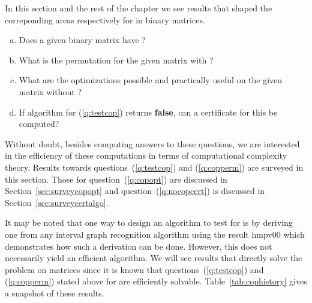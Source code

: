 In this section and the rest of the chapter we see results that shaped the
correponding areas respectively for \cop in binary matrices.

\begin{enumerate}[a.]
\singlespacing
\item \label{q:testcop} Does a given binary matrix have \COP?
\item \label{q:copperm} What is the \COP permutation for the given matrix with \COP?
\item \label{q:copopt} What are the optimizations possible and practically useful on
  the given matrix without \COP?
\item \label{q:nocopcert} If algorithm for (\ref{q:testcop}) returns
  \textbf{false}, can a certificate for this be computed?
\end{enumerate}

Without doubt, besides computing answers to these questions, we are
interested in the efficiency of these computations in terms of
computational complexity theory. Results towards
questions~(\ref{q:testcop}) and (\ref{q:copperm}) are surveyed in this
section. Those for question~(\ref{q:copopt}) are discussed in
Section~\ref{sec:surveycopopt} and question~(\ref{q:nocopcert}) is discussed
in Section~\ref{sec:surveycertalgo}.

It may be noted that one way to design an algorithm to test for \COP
is by deriving one from any interval graph recognition algorithm using the
result {\sc hmpv00}  \cite{d08phd} which demonstrates how such a derivation can be
done. However, this does not necessarily yield an efficient
algorithm. We will see results that directly solve the problem on
matrices since it is known that questions~(\ref{q:testcop}) and
(\ref{q:copperm}) stated above for \COP are efficiently solvable.
Table~\ref{tab:cophistory} gives a snapshot of these results.


